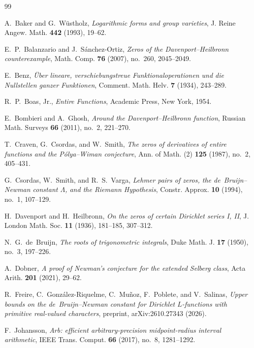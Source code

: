 \documentclass[11pt,a4paper,reqno]{amsart}
\theoremstyle{definition}
\theoremstyle{remark}
\numberwithin{equation}{section}
\begin{document}
\begin{thebibliography}{99}

A.~Baker and G.~W\"ustholz, \emph{Logarithmic forms and group varieties}, J. Reine Angew. Math. \textbf{442} (1993), 19--62.

E.~P.~Balanzario and J.~S\'anchez-Ortiz, \emph{Zeros of the Davenport--Heilbronn counterexample}, Math. Comp. \textbf{76} (2007), no.~260, 2045--2049.

E.~Benz, \emph{\"Uber lineare, verschiebungstreue Funktionaloperationen und die Nullstellen ganzer Funktionen}, Comment. Math. Helv. \textbf{7} (1934), 243--289.

R.~P.~Boas, Jr., \emph{Entire Functions}, Academic Press, New York, 1954.

E.~Bombieri and A.~Ghosh, \emph{Around the Davenport--Heilbronn function}, Russian Math. Surveys \textbf{66} (2011), no.~2, 221--270.

T.~Craven, G.~Csordas, and W.~Smith, \emph{The zeros of derivatives of entire functions and the P\'olya--Wiman conjecture}, Ann. of Math. (2) \textbf{125} (1987), no.~2, 405--431.

G.~Csordas, W.~Smith, and R.~S.~Varga, \emph{Lehmer pairs of zeros, the de~Bruijn--Newman constant $\Lambda$, and the Riemann Hypothesis}, Constr. Approx. \textbf{10} (1994), no.~1, 107--129.

H.~Davenport and H.~Heilbronn, \emph{On the zeros of certain Dirichlet series I, II}, J. London Math. Soc. \textbf{11} (1936), 181--185, 307--312.

N.~G.~de~Bruijn, \emph{The roots of trigonometric integrals}, Duke Math. J. \textbf{17} (1950), no.~3, 197--226.

A.~Dobner, \emph{A proof of Newman's conjecture for the extended Selberg class}, Acta Arith. \textbf{201} (2021), 29--62.

R.~Freire, C.~Gonz\'alez-Riquelme, C.~Mu\~noz, F.~Poblete, and V.~Salinas, \emph{Upper bounds on the de~Bruijn--Newman constant for Dirichlet $L$-functions with primitive real-valued characters}, preprint, arXiv:2610.27343 (2026).

F.~Johansson, \emph{Arb: efficient arbitrary-precision midpoint-radius interval arithmetic}, IEEE Trans. Comput. \textbf{66} (2017), no.~8, 1281--1292.


\end{thebibliography}
\end{document}
